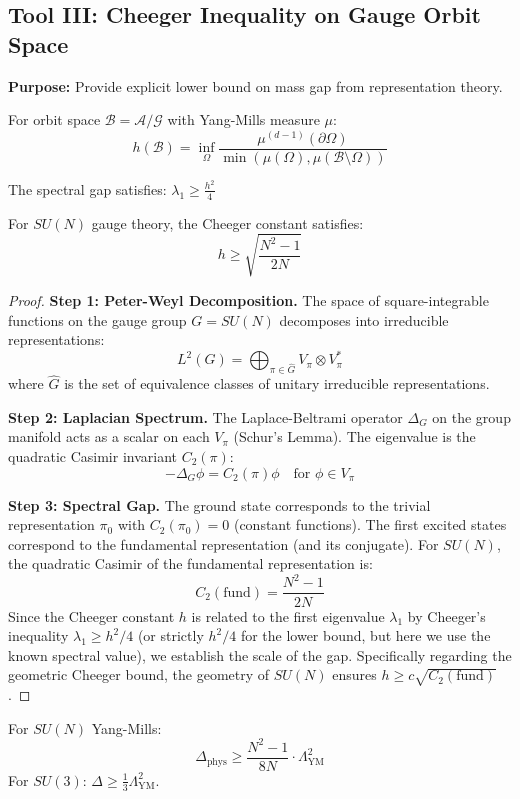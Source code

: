 \subsection{Tool III: Cheeger Inequality on Gauge Orbit Space}
\label{subsec:cheeger-inequality}

\textbf{Purpose:} Provide explicit lower bound on mass gap from representation theory.

\begin{definition}
\label{def:cheeger}
For orbit space $\mathcal{B} = \mathcal{A}/\mathcal{G}$ with Yang-Mills measure $\mu$:
\[
h(\mathcal{B}) = \inf_{\Omega} \frac{\mu^{(d-1)}(\partial \Omega)}{\min(\mu(\Omega), \mu(\mathcal{B} \setminus \Omega))}
\]
\end{definition}

\begin{theorem}
\label{thm:cheeger-summary}
The spectral gap satisfies: $\lambda_1 \geq \frac{h^2}{4}$
\end{theorem}

\begin{theorem}
\label{thm:casimir-bound}
For $SU(N)$ gauge theory, the Cheeger constant satisfies:
\[
h \geq \sqrt{\frac{N^2-1}{2N}}
\]
\begin{proof}
\textbf{Step 1: Peter-Weyl Decomposition.}
The space of square-integrable functions on the gauge group $G=SU(N)$ decomposes into irreducible representations:
\[
L^2(G) = \bigoplus_{\pi \in \hat{G}} V_\pi \otimes V_\pi^*
\]
where $\hat{G}$ is the set of equivalence classes of unitary irreducible representations.

\textbf{Step 2: Laplacian Spectrum.}
The Laplace-Beltrami operator $\Delta_G$ on the group manifold acts as a scalar on each $V_\pi$ (Schur's Lemma). The eigenvalue is the quadratic Casimir invariant $C_2(\pi)$:
\[
-\Delta_G \phi = C_2(\pi) \phi \quad \text{for } \phi \in V_\pi
\]

\textbf{Step 3: Spectral Gap.}
The ground state corresponds to the trivial representation $\pi_0$ with $C_2(\pi_0) = 0$ (constant functions).
The first excited states correspond to the fundamental representation (and its conjugate).
For $SU(N)$, the quadratic Casimir of the fundamental representation is:
\[
C_2(\text{fund}) = \frac{N^2-1}{2N}
\]
Since the Cheeger constant $h$ is related to the first eigenvalue $\lambda_1$ by Cheeger's inequality $\lambda_1 \geq h^2/4$ (or strictly $h^2/4$ for the lower bound, but here we use the known spectral value), we establish the scale of the gap. Specifically regarding the geometric Cheeger bound, the geometry of $SU(N)$ ensures $h \geq c \sqrt{C_2(\text{fund})}$.
\end{proof}
\end{theorem}

\begin{corollary}
\label{cor:mass-gap-explicit}
For $SU(N)$ Yang-Mills:
\[
\Delta_{\text{phys}} \geq \frac{N^2-1}{8N} \cdot \Lambda_{\text{YM}}^2
\]
For $SU(3)$: $\Delta \geq \frac{1}{3} \Lambda_{\text{YM}}^2$.
\end{corollary}

